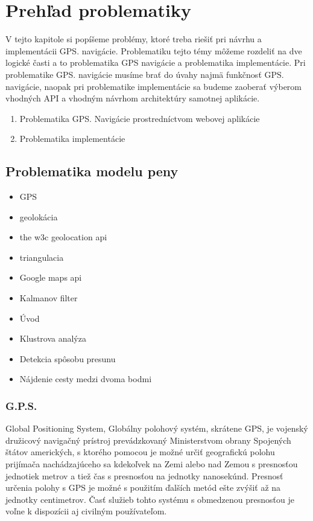\chapter{Prehľad problematiky}\label{chap:issues_overview}

V tejto kapitole si popíšeme problémy, ktoré treba riešiť pri návrhu a implementácii GPS.
navigácie.
Problematiku tejto témy môžeme rozdeliť na dve logické časti a to problematika
GPS navigácie a problematika implementácie. Pri problematike GPS. navigácie
musíme brať do úvahy najmä funkčnosť GPS. navigácie, naopak pri problematike
implementácie sa budeme zaoberať výberom vhodných API a vhodným návrhom
architektúry samotnej aplikácie.

 

\begin{enumerate}
  \item Problematika GPS. Navigácie prostredníctvom webovej aplikácie
  \item Problematika implementácie
\end{enumerate}

\section{Problematika modelu peny}
  


\begin{itemize}
\item GPS
\item geolokácia
\item the w3c geolocation api
\item triangulacia
\item Google maps api
\item Kalmanov filter
\end{itemize}



\begin{itemize}
\item Úvod 
\item Klustrova analýza
\item Detekcia spôsobu presunu
\item Nájdenie cesty medzi dvoma bodmi
\end{itemize}  

\subsection{G.P.S.}

Global Positioning System, Globálny polohový systém, skrátene GPS, je vojenský družicový
navigačný prístroj prevádzkovaný Ministerstvom obrany Spojených štátov amerických, s ktorého pomocou je možné určiť geografickú polohu prijímača nachádzajúceho sa kdekoľvek
na Zemi alebo nad Zemou s presnosťou jednotiek metrov a tiež čas s presnosťou na jednotky
nanosekúnd. Presnosť určenia polohy s GPS je možné s použitím ďalších metód ešte zvýšiť
až na jednotky centimetrov. Časť služieb tohto systému s obmedzenou presnosťou je voľne k
dispozícii aj civilným používateľom.

